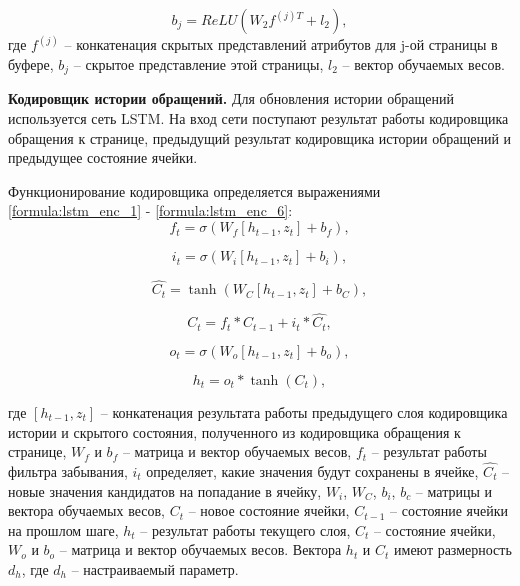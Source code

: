 \begin{equation}\label{formula:buf_page_enc_3}
	b_j = ReLU(W_2f^{(j)T} + l_2),
\end{equation}
где $f^{(j)}$ -- конкатенация скрытых представлений атрибутов для j-ой страницы в буфере, $b_j$ -- скрытое представление этой страницы, $l_2$ -- вектор обучаемых весов.

\textbf{Кодировщик истории обращений.} Для обновления истории обращений используется сеть LSTM.
На вход сети поступают результат работы кодировщика обращения к странице, предыдущий результат кодировщика истории обращений и предыдущее состояние ячейки.

Функционирование кодировщика определяется выражениями
\ref{formula:lstm_enc_1} - \ref{formula:lstm_enc_6}:
\begin{equation}\label{formula:lstm_enc_1}
	f_t = \sigma(W_f[h_{t-1}, z_t] + b_f),
\end{equation}

\begin{equation}\label{formula:lstm_enc_2}
	i_t = \sigma(W_i[h_{t-1}, z_t] + b_i),
\end{equation}

\begin{equation}\label{formula:lstm_enc_3}
	\hat{C_t} = \tanh(W_C[h_{t-1}, z_t] + b_C),
\end{equation}

\begin{equation}\label{formula:lstm_enc_4}
	C_t = f_t * C_{t-1} + i_t*\hat{C_t},
\end{equation}

\begin{equation}\label{formula:lstm_enc_5}
	o_t = \sigma(W_o[h_{t-1}, z_t] + b_o),
\end{equation}

\begin{equation}\label{formula:lstm_enc_6}
	h_t = o_t * \tanh(C_t),
\end{equation}

где $[h_{t-1}, z_t]$ -- конкатенация результата работы предыдущего слоя кодировщика истории и скрытого состояния, полученного из кодировщика обращения к странице, $W_f$ и $b_f$ -- матрица и вектор обучаемых весов, $f_t$ -- результат работы фильтра забывания, $i_t$ определяет, какие значения будут сохранены в ячейке, $\hat{C_t}$ -- новые значения кандидатов на попадание в ячейку, $W_i$, $W_C$, $b_i$, $b_c$ -- матрицы и вектора обучаемых весов, $C_t$ -- новое состояние ячейки, $C_{t-1}$ -- состояние ячейки на прошлом шаге, $h_t$ -- результат работы текущего слоя, $C_t$ -- состояние ячейки, $W_o$ и $b_o$ -- матрица и вектор обучаемых весов.
Вектора $h_t$ и $C_t$ имеют размерность $d_h$, где $d_h$ -- настраиваемый параметр.


